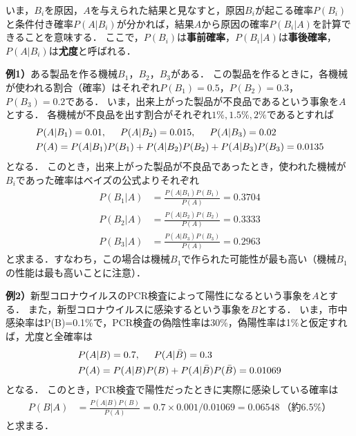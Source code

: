 %
いま，$ B_{i} $を原因，$ A $を与えられた結果と見なすと，原因$ B_{i} $が起こる確率$ P(B_{i}) $と条件付き確率$ P(A|B_{i}) $が分かれば，結果$ A $から原因の確率$ P(B_{i}|A) $を計算できることを意味する．
%
ここで，$ P(B_{i}) $は\textbf{事前確率}，$ P(B_{i}|A) $は\textbf{事後確率}，$ P(A|B_{i}) $は\textbf{尤度}と呼ばれる．


\vspace{0.5cm}
\textbf{例1）}ある製品を作る機械$ B_{1} $，$ B_{2} $，$ B_{3} $がある．
%
この製品を作るときに，各機械が使われる割合（確率）はそれぞれ$ P(B_{1})=0.5 $，$ P(B_{2})=0.3 $，$ P(B_{3})=0.2 $である．
%
いま，出来上がった製品が不良品であるという事象を$ A $とする．
%
各機械が不良品を出す割合がそれぞれ$ 1\%,1.5\%,2\% $であるとすれば
%
\begin{align*}
	&P(A|B_{1}) = 0.01, \hspace{0.5cm} P(A|B_{2}) = 0.015, \hspace{0.5cm} P(A|B_{3}) = 0.02\\
	&P(A) = P(A|B_{1})P(B_{1}) + P(A|B_{2})P(B_{2}) + P(A|B_{3})P(B_{3}) = 0.0135
\end{align*}
%
となる．
%
このとき，出来上がった製品が不良品であったとき，使われた機械が$ B_{i} $であった確率はベイズの公式よりそれぞれ
%
\begin{align*}
	P(B_{1}|A) &= \frac{P(A|B_{1})P(B_{1})}{P(A)} = 0.3704 \\
	P(B_{2}|A) &= \frac{P(A|B_{2})P(B_{2})}{P(A)} = 0.3333 \\
	P(B_{3}|A) &= \frac{P(A|B_{3})P(B_{3})}{P(A)} = 0.2963 
\end{align*}
%
と求まる．すなわち，この場合は機械$ B_{1} $で作られた可能性が最も高い（機械$ B_{1} $の性能は最も高いことに注意）．

\vspace{0.5cm}
\textbf{例2）}新型コロナウイルスのPCR検査によって陽性になるという事象を$ A $とする．
%
また，新型コロナウイルスに感染するという事象を$ B $とする．
%
いま，市中感染率はP(B)=0.1\%で，PCR検査の偽陰性率は30\%，偽陽性率は1\%と仮定すれば，尤度と全確率は
%
\begin{align*}
	&P(A|B) = 0.7, \hspace{0.5cm} P(A|\bar{B})=0.3 \\
	&P(A) = P(A|B)P(B) + P(A|\bar{B})P(\bar{B}) = 0.01069
\end{align*}
%
となる．
%
このとき，PCR検査で陽性だったときに実際に感染している確率は
%
\begin{align*}
	P(B|A) &= \frac{P(A|B)P(B)}{P(A)} = 0.7\times 0.001/0.01069 = 0.06548\ （約6.5\%）
\end{align*}
%
と求まる．
%

